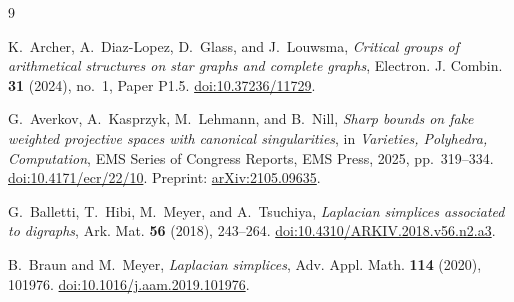 \documentclass[11pt]{article}
\theoremstyle{remark}
\begin{document}
\begin{thebibliography}{9}

K.~Archer, A.~Diaz-Lopez, D.~Glass, and J.~Louwsma,
\emph{Critical groups of arithmetical structures on star graphs and complete graphs},
Electron. J. Combin. \textbf{31} (2024), no.~1, Paper P1.5.
\href{https://doi.org/10.37236/11729}{doi:10.37236/11729}.

G.~Averkov, A.~Kasprzyk, M.~Lehmann, and B.~Nill,
\emph{Sharp bounds on fake weighted projective spaces with canonical singularities},
in \emph{Varieties, Polyhedra, Computation}, EMS Series of Congress Reports,
EMS Press, 2025, pp.~319--334.
\href{https://doi.org/10.4171/ecr/22/10}{doi:10.4171/ecr/22/10}.
Preprint: \href{https://arxiv.org/abs/2105.09635}{arXiv:2105.09635}.

G.~Balletti, T.~Hibi, M.~Meyer, and A.~Tsuchiya,
\emph{Laplacian simplices associated to digraphs},
Ark. Mat. \textbf{56} (2018), 243--264.
\href{https://doi.org/10.4310/ARKIV.2018.v56.n2.a3}{doi:10.4310/ARKIV.2018.v56.n2.a3}.

B.~Braun and M.~Meyer,
\emph{Laplacian simplices},
Adv. Appl. Math. \textbf{114} (2020), 101976.
\href{https://doi.org/10.1016/j.aam.2019.101976}{doi:10.1016/j.aam.2019.101976}.

\end{thebibliography}
\end{document}
